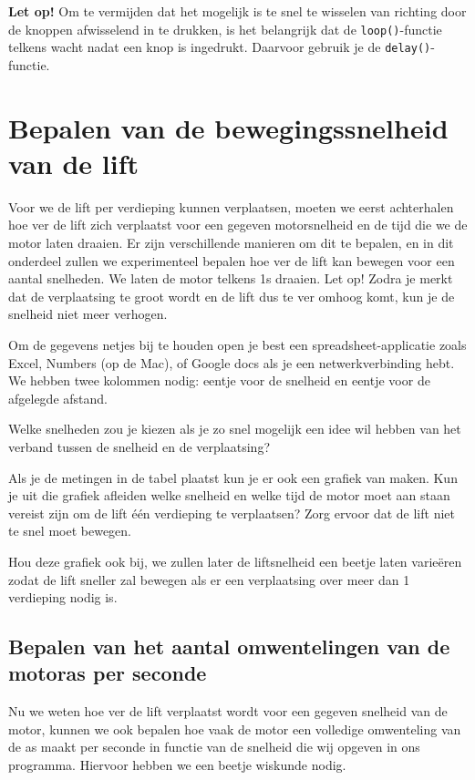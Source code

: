 \documentclass[a4paper, 10pt]{article}
\begin{document}
\textbf{Let op!} Om te vermijden dat het mogelijk is te snel te wisselen van richting door de knoppen afwisselend in te
drukken, is het belangrijk dat de \texttt{loop()}-functie telkens wacht nadat een knop is ingedrukt. Daarvoor gebruik je
de \texttt{delay()}-functie.

\section{Bepalen van de bewegingssnelheid van de lift}

Voor we de lift per verdieping kunnen verplaatsen, moeten we eerst achterhalen hoe ver de lift zich verplaatst voor
een gegeven motorsnelheid en de tijd die we de motor laten draaien. Er zijn verschillende manieren om dit te bepalen,
en in dit onderdeel zullen we experimenteel bepalen hoe ver de lift kan bewegen voor een aantal snelheden. We laten
de motor telkens 1s draaien. Let op! Zodra je merkt dat de verplaatsing te groot wordt en de lift dus te ver omhoog
komt, kun je de snelheid niet meer verhogen.

Om de gegevens netjes bij te houden open je best een spreadsheet-applicatie zoals Excel, Numbers (op de Mac), of Google
docs als je een netwerkverbinding hebt. We hebben twee kolommen nodig: eentje voor de snelheid en eentje voor de afgelegde
afstand.

Welke snelheden zou je kiezen als je zo snel mogelijk een idee wil hebben van het verband tussen de snelheid
en de verplaatsing?

Als je de metingen in de tabel plaatst kun je er ook een grafiek van maken. Kun je uit die grafiek afleiden welke
snelheid en welke tijd de motor moet aan staan  vereist zijn om de lift \'e\'en verdieping te verplaatsen?
Zorg ervoor dat de lift niet te snel moet bewegen.

Hou deze grafiek ook bij, we zullen later de liftsnelheid een beetje laten varie\"eren zodat de lift sneller zal
bewegen als er een verplaatsing over meer dan 1 verdieping nodig is.

\subsection{Bepalen van het aantal omwentelingen van de motoras per seconde}

Nu we weten hoe ver de lift verplaatst wordt voor een gegeven snelheid van de motor, kunnen we ook bepalen
hoe vaak de motor een volledige omwenteling van de as maakt per seconde in functie van de snelheid die wij
opgeven in ons programma. Hiervoor hebben we een beetje wiskunde nodig.
\end{document}
